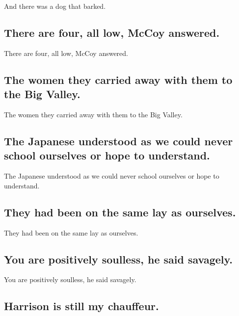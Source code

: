 \documentclass[]{article}
\begin{document}
And there was a dog that barked.

\hypertarget{there-are-four-all-low-mccoy-answered.}{%
\subsection{There are four, all low, McCoy
answered.}\label{there-are-four-all-low-mccoy-answered.}}

There are four, all low, McCoy answered.

\hypertarget{the-women-they-carried-away-with-them-to-the-big-valley.}{%
\subsection{The women they carried away with them to the Big
Valley.}\label{the-women-they-carried-away-with-them-to-the-big-valley.}}

The women they carried away with them to the Big Valley.

\hypertarget{the-japanese-understood-as-we-could-never-school-ourselves-or-hope-to-understand.}{%
\subsection{The Japanese understood as we could never school ourselves
or hope to
understand.}\label{the-japanese-understood-as-we-could-never-school-ourselves-or-hope-to-understand.}}

The Japanese understood as we could never school ourselves or hope to
understand.

\hypertarget{they-had-been-on-the-same-lay-as-ourselves.}{%
\subsection{They had been on the same lay as
ourselves.}\label{they-had-been-on-the-same-lay-as-ourselves.}}

They had been on the same lay as ourselves.

\hypertarget{you-are-positively-soulless-he-said-savagely.}{%
\subsection{You are positively soulless, he said
savagely.}\label{you-are-positively-soulless-he-said-savagely.}}

You are positively soulless, he said savagely.

\hypertarget{harrison-is-still-my-chauffeur.}{%
\subsection{Harrison is still my
chauffeur.}\label{harrison-is-still-my-chauffeur.}}
\end{document}
